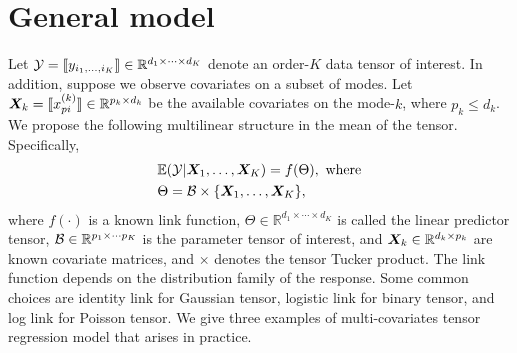 \documentclass[twoside]{article}
\theoremstyle{plain}
\theoremstyle{definition}
\begin{document}
\section{General model}
Let $\mathcal{Y}=\llbracket y_{i_1,\ldots,i_K} \rrbracket\in\mathbb{R}^{d_1\times \cdots\times d_K}$ denote an order-$K$ data tensor of interest. In addition, suppose we observe covariates on a subset of modes. Let $\bm X_k=\llbracket x^{(k)}_{pi} \rrbracket\in\mathbb{R}^{p_k\times d_k}$ be the available covariates on the mode-$k$, where $p_k\leq d_k$. We propose the following multilinear structure in the mean of the tensor. Specifically, 
\begin{align}\label{eq:tensormodel}
&\mathbb{E}(\mathcal{Y}|\bm X_1,\ldots,\bm X_K)=f(\Theta),\ \text{where}\\
&\Theta =\mathcal{B}\times\{\bm X_1,\ldots,\bm X_K\} ,
\end{align}
where $f(\cdot)$ is a known link function, $\Theta\in\mathbb{R}^{d_1\times \cdots\times d_K}$ is called the linear predictor tensor, $\mathcal{B}\in\mathbb{R}^{p_1\times \cdots p_K}$ is the parameter tensor of interest, and $\bm X_k\in\mathbb{R}^{d_k\times p_k}$ are known covariate matrices, and $\times$ denotes the tensor Tucker product. The link function depends on the distribution family of the response. Some common choices are identity link for Gaussian tensor, logistic link for binary tensor, and log link for Poisson tensor. We give three examples of multi-covariates tensor regression model that arises in practice. 
\end{document}
